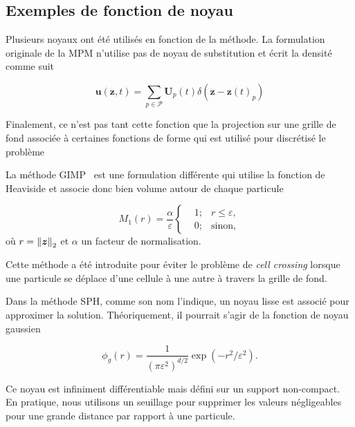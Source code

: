 \subsection{Exemples de fonction de noyau}

Plusieurs noyaux ont été utilisés en fonction de la méthode. La formulation originale de la MPM n'utilise pas de noyau de substitution et écrit la densité comme suit

\begin{equation*}
    \bm{u}(\bm{z}, t) = \sum_{p \in \mathcal P} \bm{U}_p(t) \delta (\bm{z}-\bm{z}(t)_p)
\end{equation*}

Finalement, ce n'est pas tant cette fonction que la projection sur une grille de fond associée à certaines fonctions de forme qui est utilisé pour discrétisé le problème~\cite{sulsky_particle_1994}

La méthode GIMP~\cite{bardenhagen_generalized_2004} est une formulation différente qui utilise la fonction de Heaviside et associe donc bien volume autour de chaque particule

\begin{equation*}
    M_1(r) = \frac{\alpha}{\varepsilon}\left\{\begin{aligned}
         & 1; & r \leq \varepsilon, \\
         & 0; & \text{sinon},
    \end{aligned}
    \right.
\end{equation*}où $r = \left\lVert \bm{z} \right\rVert_2$ et $\alpha$ un facteur de normalisation.

Cette méthode a été introduite pour éviter le problème de \textit{cell crossing} lorsque une particule se déplace d'une cellule à une autre à travers la grille de fond.

Dans la méthode SPH, comme son nom l'indique, un noyau lisse est associé pour approximer la solution. Théoriquement, il pourrait s'agir de la fonction de noyau gaussien

\begin{equation*}
    \phi_g(r) = \frac{1}{{(\pi \varepsilon^2)}^{d/2}} \exp(-r^2/\varepsilon^2).
\end{equation*}

Ce noyau est infiniment différentiable mais défini sur un support non-compact. En pratique, nous utilisons un seuillage pour supprimer les valeurs négligeables pour une grande distance par rapport à une particule.

